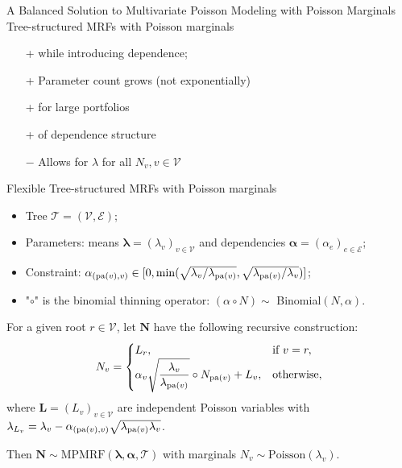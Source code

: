 \documentclass[11pt,xcolor={dvipsnames},hyperref={pdftex,pdfpagemode=UseNone,hidelinks,pdfdisplaydoctitle=true},usepdftitle=false]{beamer}
\begin{document}
\begin{frame}{A Balanced Solution to Multivariate Poisson Modeling with Poisson Marginals}
Tree-structured MRFs with Poisson marginals \citep{cote2025tree} 
\begin{itemize}
        \item[+]  while introducing dependence;
        \vfill
        \item[+] Parameter count grows  
        (not exponentially)
        \vfill
        \item[+]  for large portfolios
        \vfill
        \item[+]  of dependence structure
        \vfill
        \item[$-$] Allows for  $\lambda$ for all $N_v, v \in \mathcal{V}$ 
\end{itemize}
\end{frame}
\begin{frame}{Flexible Tree-structured MRFs with Poisson marginals}
    \begin{itemize}
            \item Tree $\mathcal{T} = (\mathcal{V}, \mathcal{E})$;
            \item Parameters: means $\boldsymbol{\lambda} = (\lambda_v)_{v \in \mathcal{V}}$ and dependencies $\boldsymbol{\alpha} = (\alpha_e)_{e \in \mathcal{E}}$;
            \item Constraint: $\alphav{v} \in [0, \min(\sqrt{{\lambda_{v}}/{\lambda_{\pa{v}}}}, \sqrt{{\lambda_{\pa{v}}}/{\lambda_{v}}})]$;
         \item  "$\circ$" is the binomial thinning operator: $(\alpha\circ N) \sim$ Binomial$(N,\alpha)$.
    \end{itemize}
    \pause
\begin{theorem}
For a given root $r \in \mathcal{V}$, let $\boldsymbol{N}$ have the following recursive construction:
        \begin{equation*}
        N_v = 
        \begin{cases}
        L_r, & \text{if } v = r, \\ 
        \alpha_v \sqrt{\dfrac{\lambda_v}{\lambda_{\pa{v}}}} \circ N_{\pa{v}} + L_v, & \text{otherwise},
        \end{cases}
        \vspace{-0.1cm}
        \end{equation*}
        where $\boldsymbol{L} = (L_v)_{v\in\mathcal{V}}$ are independent Poisson variables with $\lambda_{L_v} = \lambda_v- \alpha_{(\mathrm{pa}(v), v)}\sqrt{\lambda_{\mathrm{pa}(v)}\lambda_v}$.
        
        Then $\boldsymbol{N} \sim \text{MPMRF}(\boldsymbol{\lambda}, \boldsymbol{\alpha}, \mathcal{T})$ with marginals $N_v \sim \text{Poisson}(\lambda_v)$.
\end{theorem}
    

\end{frame}
\end{document}

